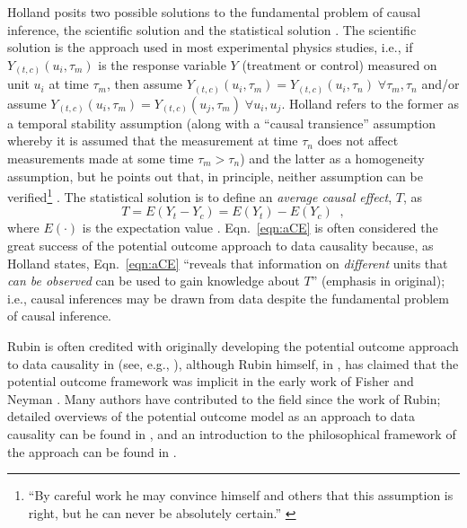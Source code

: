 \documentclass{article}[10pt]
\begin{document}
Holland posits two possible solutions to the fundamental problem of causal inference, the scientific solution and the statistical solution \cite{Holland1986}.  The scientific solution is the approach used in most experimental physics studies, i.e., if $Y_{(t,c)}(u_i,\tau_m)$ is the response variable $Y$ (treatment or control) measured on unit $u_i$ at time $\tau_m$, then assume $Y_{(t,c)}(u_i,\tau_m)=Y_{(t,c)}(u_i,\tau_n)\;\forall\tau_m,\tau_n$ and/or assume $Y_{(t,c)}(u_i,\tau_m)=Y_{(t,c)}(u_j,\tau_m)\;\forall u_i,u_j$.  Holland refers to the former as a temporal stability assumption (along with a ``causal transience'' assumption whereby it is assumed that the measurement at time $\tau_n$ does not affect measurements made at some time $\tau_m>\tau_n$) and the latter as a homogeneity assumption, but he points out that, in principle, neither assumption can be verified\footnote{``By careful work he may convince himself and others that this assumption is right, but he can never be absolutely certain.'' \cite{Holland1986}} \cite{Holland1986}.  The statistical solution is to define an {\em average causal effect}, $T$, as
\begin{equation}
\label{eqn:aCE}
T = E\left(Y_t-Y_c\right) = E\left(Y_t\right)-E\left(Y_c\right)\;\;,
\end{equation}
where $E(\cdot)$ is the expectation value \cite{Holland1986,Morgan2014,Imbens2015}.  Eqn.\ \ref{eqn:aCE} is often considered the great success of the potential outcome approach to data causality because, as Holland states, Eqn.\ \ref{eqn:aCE} ``reveals that information on {\em different} units that {\em can be observed} can be used to gain knowledge about $T$'' \cite{Holland1986} (emphasis in original); i.e., causal inferences may be drawn from data despite the fundamental problem of causal inference.

Rubin is often credited with originally developing the potential outcome approach to data causality in \cite{Rubin1974} (see, e.g., \cite{Holland1986,Morgan2014}), although Rubin himself, in \cite{Rubin1986}, has claimed that the potential outcome framework was implicit in the early work of Fisher \cite{Fisher1960} and Neyman \cite{Neyman1935}.  Many authors have contributed to the field since the work of Rubin; detailed overviews of the potential outcome model as an approach to data causality can be found in \cite{Morgan2014,Imbens2015}, and an introduction to the philosophical framework of the approach can be found in \cite{Illari2014}.
\end{document}
